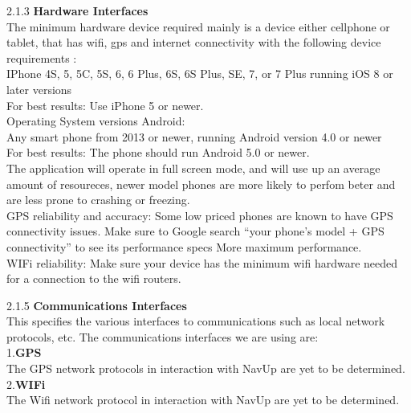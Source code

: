 \documentclass[11pt]{article}
\begin{document}
\begin{flushleft}
\item 2.1.3 \textbf{Hardware Interfaces }\\
The minimum hardware device required  mainly is a device either cellphone or tablet, that has wifi, gps and internet connectivity with the following device requirements :\\
IPhone 4S, 5, 5C, 5S, 6, 6 Plus, 6S, 6S Plus, SE, 7, or 7 Plus running iOS 8 or later versions\\
For best results: Use iPhone 5 or newer.\\
 Operating System versions Android:\\
Any smart phone from 2013 or newer, running Android version 4.0 or newer\\
For best results: The phone should run Android 5.0 or newer. \\
The application will operate in full screen mode, and will use up an average amount of resoureces,
newer model phones are more likely to perfom beter and are less prone to crashing or freezing.\\
GPS reliability and accuracy: Some low priced phones are known to have GPS connectivity issues. Make sure to Google search “your phone’s model + GPS connectivity” to see its performance specs
More maximum performance.\\
WIFi  reliability: Make sure your device has the minimum wifi hardware needed for a connection to the wifi routers.
\end{flushleft}

\begin{flushleft}
\item 2.1.5 \textbf{Communications Interfaces}\\
This specifies the various interfaces to communications such as local network protocols, etc. The communications interfaces we are using are:\\
1.\textbf{GPS}\\
The GPS network protocols in interaction with NavUp are yet to be determined.\\
2.\textbf{WIFi}\\
The Wifi network protocol in interaction with NavUp are yet to be determined. 
\end{flushleft}
\end{document}
